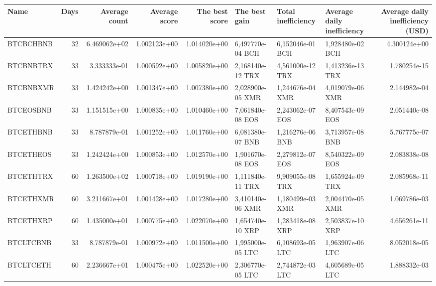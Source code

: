 \begin{tabular}{lrrrrlllr}
\toprule
       Name &  Days &  Average count &  Average score &  The best score &     The best gain & Total inefficiency & Average daily inefficiency &  Average daily inefficiency (USD) \\
\midrule
  BTCBCHBNB &    32 &   6.469062e+02 &   1.002123e+00 &    1.014020e+00 &  6,497770e-04 BCH &   6,152046e-01 BCH &           1,928480e-02 BCH &                      4.300124e+00 \\
  BTCBNBTRX &    33 &   3.333333e-01 &   1.000592e+00 &    1.005820e+00 &  2,168140e-12 TRX &   4,561000e-12 TRX &           1,413236e-13 TRX &                      1.780254e-15 \\
  BTCBNBXMR &    33 &   1.424242e+00 &   1.001347e+00 &    1.007380e+00 &  2,028900e-05 XMR &   1,244676e-04 XMR &           4,019079e-06 XMR &                      2.144982e-04 \\
  BTCEOSBNB &    33 &   1.151515e+00 &   1.000835e+00 &    1.010460e+00 &  7,061840e-08 EOS &   2,243062e-07 EOS &           8,407543e-09 EOS &                      2.051440e-08 \\
  BTCETHBNB &    33 &   8.787879e-01 &   1.001252e+00 &    1.011760e+00 &  6,081380e-07 BNB &   1,216276e-06 BNB &           3,713957e-08 BNB &                      5.767775e-07 \\
  BTCETHEOS &    33 &   1.242424e+00 &   1.000853e+00 &    1.012570e+00 &  1,901670e-08 EOS &   2,279812e-07 EOS &           8,540322e-09 EOS &                      2.083838e-08 \\
  BTCETHTRX &    60 &   1.263500e+02 &   1.000718e+00 &    1.019190e+00 &  1,111840e-11 TRX &   9,909055e-08 TRX &           1,655924e-09 TRX &                      2.085968e-11 \\
  BTCETHXMR &    60 &   3.211667e+01 &   1.001428e+00 &    1.017280e+00 &  3,410140e-06 XMR &   1,180499e-03 XMR &           2,004470e-05 XMR &                      1.069786e-03 \\
  BTCETHXRP &    60 &   1.435000e+01 &   1.000775e+00 &    1.022070e+00 &  1,654740e-10 XRP &   1,283418e-08 XRP &           2,503837e-10 XRP &                      4.656261e-11 \\
  BTCLTCBNB &    33 &   8.787879e-01 &   1.000972e+00 &    1.011500e+00 &  1,995000e-05 LTC &   6,108693e-05 LTC &           1,963907e-06 LTC &                      8.052018e-05 \\
  BTCLTCETH &    60 &   2.236667e+01 &   1.000475e+00 &    1.022520e+00 &  2,306770e-05 LTC &   2,744872e-03 LTC &           4,605689e-05 LTC &                      1.888332e-03 \\

\end{tabular}
